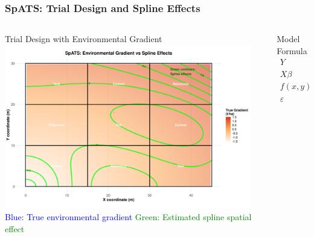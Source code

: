 \documentclass[aspectratio=43]{beamer}
\begin{document}
\begin{frame}
    \frametitle{SpATS: Trial Design and Spline Effects}
    \begin{columns}[T]
        \begin{column}{0.55\textwidth}
            \begin{block}{Trial Design with Environmental Gradient}
                \centering
                \includegraphics[width=0.95\textwidth]{Imgs/spats_trial_design_spline.png}
                \vspace{0.5em}
                \scriptsize
                \textcolor{blue}{Blue: True environmental gradient}
                \textcolor{green}{Green: Estimated spline spatial effect}
            \end{block}
        \end{column}
        \begin{column}{0.45\textwidth}
            \begin{block}{Model Formula}
                \vspace{0.5em}
                \begin{align*}
                    Y &= X\beta + f(x, y) + \varepsilon \\
                    X\beta &: \text{Treatment effect} \\
                    f(x, y) &: \text{Smooth spatial surface} \\
                    \varepsilon &: \text{Random error}
                \end{align*}
            \end{block}
        \end{column}
    \end{columns}
\end{frame}
\end{document}
